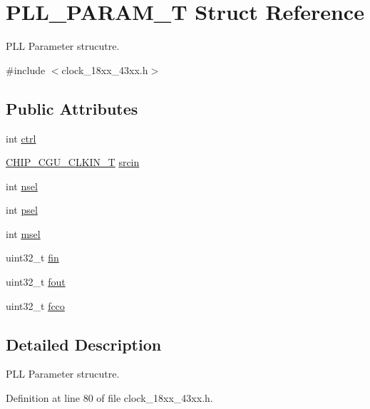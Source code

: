 \hypertarget{struct_p_l_l___p_a_r_a_m___t}{}\section{P\+L\+L\+\_\+\+P\+A\+R\+A\+M\+\_\+T Struct Reference}
\label{struct_p_l_l___p_a_r_a_m___t}


P\+LL Parameter strucutre.  




{\ttfamily \#include $<$clock\+\_\+18xx\+\_\+43xx.\+h$>$}

\subsection*{Public Attributes}
\begin{DoxyCompactItemize}
\item 
int \hyperlink{struct_p_l_l___p_a_r_a_m___t_a561053e8a887529fdd516f7189932e2d}{ctrl}
\item 
\hyperlink{group___c_l_o_c_k__18_x_x__43_x_x_ga0975326707efebf2b074283e6c602f18}{C\+H\+I\+P\+\_\+\+C\+G\+U\+\_\+\+C\+L\+K\+I\+N\+\_\+T} \hyperlink{struct_p_l_l___p_a_r_a_m___t_a747254637e606b8056c84c5bf789f861}{srcin}
\item 
int \hyperlink{struct_p_l_l___p_a_r_a_m___t_a81bb63bb510f2b9182af7e7efe5afefb}{nsel}
\item 
int \hyperlink{struct_p_l_l___p_a_r_a_m___t_ac0cd3eaef5877c3b5ee7a0e3508d9735}{psel}
\item 
int \hyperlink{struct_p_l_l___p_a_r_a_m___t_a628a188549a6ad28a8c15e94e0546418}{msel}
\item 
uint32\+\_\+t \hyperlink{struct_p_l_l___p_a_r_a_m___t_a7005dd392046aa69665aa21ddfb95838}{fin}
\item 
uint32\+\_\+t \hyperlink{struct_p_l_l___p_a_r_a_m___t_aca9bc168a72e3e2d9c2c12bc042f7a6e}{fout}
\item 
uint32\+\_\+t \hyperlink{struct_p_l_l___p_a_r_a_m___t_a905f1038099f6893236770446c30559d}{fcco}
\end{DoxyCompactItemize}


\subsection{Detailed Description}
P\+LL Parameter strucutre. 

Definition at line 80 of file clock\+\_\+18xx\+\_\+43xx.\+h.



